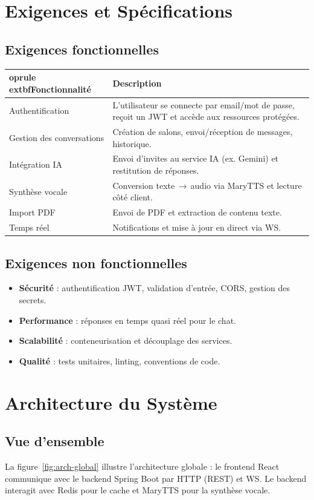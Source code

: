 \documentclass[12pt,a4paper]{report}
\begin{document}
\chapter{Exigences et Spécifications}
\section{Exigences fonctionnelles}
\begin{longtable}{p{4.2cm} p{10cm}}
	oprule
	extbf{Fonctionnalité} & \textbf{Description}\\
\midrule\endhead
Authentification & L'utilisateur se connecte par email/mot de passe, reçoit un \ac{JWT} et accède aux ressources protégées.\\
Gestion des conversations & Création de salons, envoi/réception de messages, historique.\\
Intégration IA & Envoi d'invites au service IA (ex. Gemini) et restitution de réponses.\\
Synthèse vocale & Conversion texte\,$\to$\,audio via MaryTTS et lecture côté client.\\
Import PDF & Envoi de PDF et extraction de contenu texte.\\
Temps réel & Notifications et mise à jour en direct via \ac{WS}.\\
\bottomrule
\end{longtable}

\section{Exigences non fonctionnelles}
\begin{itemize}[leftmargin=*,nosep]
  \item \textbf{Sécurité} : authentification JWT, validation d'entrée, CORS, gestion des secrets.
  \item \textbf{Performance} : réponses en \og temps quasi réel \fg{} pour le chat.
  \item \textbf{Scalabilité} : conteneurisation et découplage des services.
  \item \textbf{Qualité} : tests unitaires, linting, conventions de code.
\end{itemize}

\chapter{Architecture du Système}
\section{Vue d'ensemble}
La figure~\ref{fig:arch-global} illustre l'architecture globale : le frontend React communique avec le backend Spring Boot par \ac{HTTP} (REST) et \ac{WS}. Le backend interagit avec Redis pour le cache et MaryTTS pour la synthèse vocale.
\end{document}
